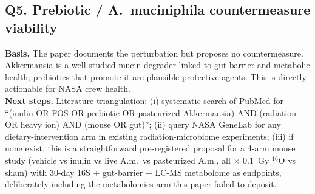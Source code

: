 \subsection*{Q5. Prebiotic / A.~muciniphila countermeasure viability}
\textbf{Basis.} The paper documents the perturbation but proposes no countermeasure. Akkermansia is a well-studied mucin-degrader linked to gut barrier and metabolic health; prebiotics that promote it are plausible protective agents. This is directly actionable for NASA crew health. \\
\textbf{Next steps.} Literature triangulation: (i) systematic search of PubMed for ``(inulin OR FOS OR prebiotic OR pasteurized Akkermansia) AND (radiation OR heavy ion) AND (mouse OR gut)''; (ii) query NASA GeneLab for any dietary-intervention arm in existing radiation-microbiome experiments; (iii) if none exist, this is a straightforward pre-registered proposal for a 4-arm mouse study (vehicle vs inulin vs live A.m.\ vs pasteurized A.m., all $\times$ 0.1~Gy $^{16}$O vs sham) with 30-day 16S + gut-barrier + LC-MS metabolome as endpoints, deliberately including the metabolomics arm this paper failed to deposit.
